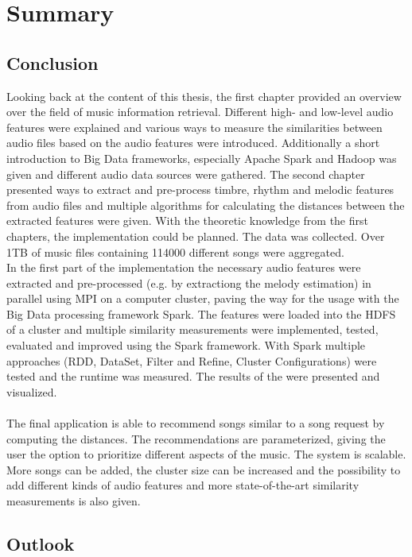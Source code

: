 \chapter{Summary}

\section{Conclusion}

Looking back at the content of this thesis, the first chapter provided an overview over the field of music information retrieval. Different high- and low-level audio features were explained and various ways to measure the similarities between audio files based on the audio features were introduced. Additionally a short introduction to Big Data frameworks, especially Apache Spark and Hadoop was given and different audio data sources were gathered. The second chapter presented ways to extract and pre-process timbre, rhythm and melodic features from audio files and multiple algorithms for calculating the distances between the extracted features were given. With the theoretic knowledge from the first chapters, the implementation could be planned. The data was collected. Over 1TB of music files containing 114000 different songs were aggregated.\\ 
In the first part of the implementation the necessary audio features were extracted and pre-processed (e.g. by extractiong the melody estimation) in parallel using MPI on a computer cluster, paving the way for the usage with the Big Data processing framework Spark.
The features were loaded into the HDFS of a cluster and multiple similarity measurements were implemented, tested, evaluated and improved using the Spark framework. With Spark multiple approaches (RDD, DataSet, Filter and Refine, Cluster Configurations) were tested and the runtime was measured. The results of the were presented and visualized.\\
\ \\
The final application is able to recommend songs similar to a song request by computing the distances. The recommendations are parameterized, giving the user the option to prioritize different aspects of the music. The system is scalable. More songs can be added, the cluster size can be increased and the possibility to add different kinds of audio features and more state-of-the-art similarity measurements is also given. 

\section{Outlook}

